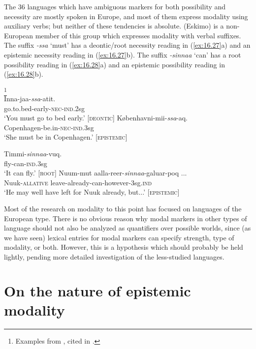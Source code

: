 The 36 languages which have ambiguous markers for both possibility and necessity are mostly spoken in Europe, and most of them express modality using auxiliary verbs; but neither of these tendencies is absolute.  (Eskimo) is a non-European member of this group which expresses modality with verbal suffixes. The suffix \textit{-ssa} ‘must’ has a deontic/root necessity reading in (\ref{ex:16.27}a) and an epistemic necessity reading in (\ref{ex:16.27}b). The suffix \textit{-sinnaa} ‘can’ has a root possibility reading in (\ref{ex:16.28}a) and an epistemic possibility reading in (\ref{ex:16.28}b).


\ea \label{ex:16.27}
\footnote{Examples from \citet[292–294, p.c.]{Fortescue1984}, cited in \citet{vanderAuweraAmmann2013}.} \\ 
\ea  \gll Inna-jaa-\textit{ssa}-atit.\\
go.to.bed-early-\textsc{nec-ind}.2sg\\
\glt ‘You must go to bed early.’ \hfill  [\textsc{deontic}]
\ex \gll Københavni-mii-\textit{ssa}-aq.\\
Copenhagen-be.in-\textsc{nec-ind}.3sg\\
\glt ‘She must be in Copenhagen.’ \hfill  [\textsc{epistemic}]
\z \z

\ea \label{ex:16.28} \gll Timmi-\textit{sinnaa}-vuq.\\
fly-can-\textsc{ind}.3sg\\
\glt ‘It can fly.’ \hfill  [\textsc{root}]
\ex \gll  Nuum-mut  aalla-reer-\textit{sinnaa}-galuar-poq ...\\
Nuuk-\textsc{allative}  leave-already-can-however-3sg.\textsc{ind}\\
\glt ‘He may well have left for Nuuk already, but...’ \hfill  [\textsc{epistemic}]
\z


Most of the research on modality to this point has focused on languages of the European type. There is no obvious reason why modal markers in other types of language should not also be analyzed as quantifiers over possible worlds, since (as we have seen) lexical entries for modal markers can specify strength, type of modality, or both. However, this is a hypothesis which should probably be held lightly, pending more detailed investigation of the less-studied languages.


\section{On the nature of epistemic modality}\label{sec:16.5}

